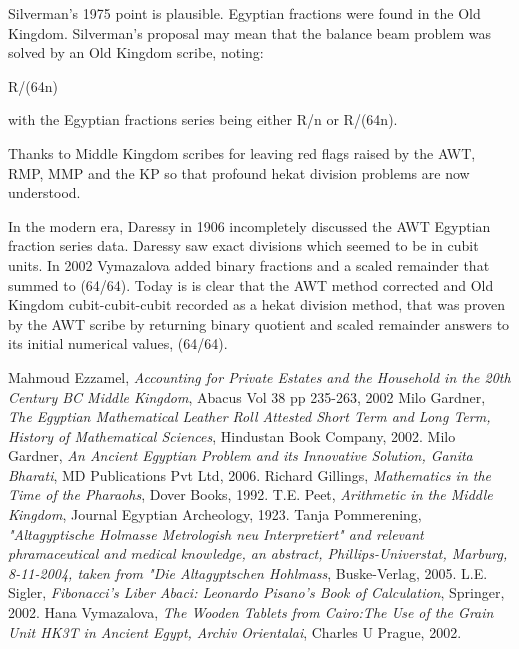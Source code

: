 \documentclass[12pt]{article}
\begin{document}
Silverman's 1975 point is plausible. Egyptian fractions were found in the Old Kingdom. Silverman's proposal may mean that the balance beam problem was solved by an Old Kingdom scribe, noting:

R/(64n)

with the Egyptian fractions series being either R/n or R/(64n).

Thanks to Middle Kingdom scribes for leaving red flags raised by the AWT, RMP, MMP and the KP so that profound hekat division problems are now understood. 

In the modern era, Daressy in 1906 incompletely discussed the AWT Egyptian fraction series data. Daressy saw exact divisions which seemed to be in cubit units. In 2002 Vymazalova added binary fractions and a scaled remainder that summed to (64/64). Today is is clear that the AWT method corrected and Old Kingdom cubit-cubit-cubit recorded as a hekat division method, that was proven by the AWT scribe by returning binary quotient and scaled remainder answers to its initial numerical values, (64/64).

\begin{thebibliography}{8}
 Mahmoud Ezzamel, \emph{Accounting for Private Estates and the Household in the 20th Century BC Middle Kingdom}, Abacus Vol 38 pp 235-263, 2002
 Milo Gardner, \emph{The Egyptian Mathematical Leather Roll Attested Short Term and Long Term, History of Mathematical Sciences}, Hindustan Book Company, 2002.
 Milo Gardner, \emph{An Ancient Egyptian Problem and its Innovative Solution, Ganita Bharati}, MD Publications Pvt Ltd, 2006.
Richard Gillings, \emph{Mathematics in the Time of the Pharaohs}, Dover Books, 1992.
 T.E. Peet, \emph{Arithmetic in the Middle Kingdom}, Journal Egyptian Archeology, 1923.
 Tanja Pommerening, \emph{"Altagyptische Holmasse Metrologish neu Interpretiert" and relevant phramaceutical and medical knowledge, an abstract,  Phillips-Universtat, Marburg, 8-11-2004, taken from "Die Altagyptschen Hohlmass}, Buske-Verlag, 2005.
 L.E. Sigler, \emph{Fibonacci's Liber Abaci: Leonardo Pisano's Book of Calculation}, Springer, 2002.
 Hana Vymazalova, \emph{The Wooden Tablets from Cairo:The Use of the Grain Unit HK3T in Ancient Egypt, Archiv Orientalai}, Charles U Prague, 2002.

\end{thebibliography}

\end{document}
